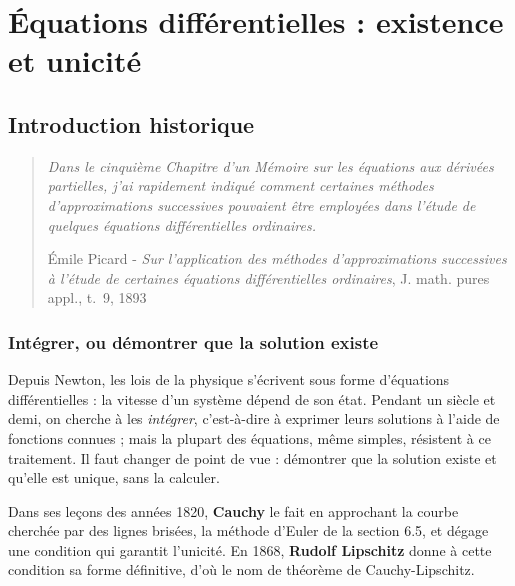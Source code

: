 \documentclass[a4paper,twoside]{report}
\begin{document}
\setcounter{chapter}{5}

\chapter[Équations différentielles : existence]{Équations différentielles : existence et unicité}

\section{Introduction historique}

\begin{quote}
\emph{Dans le cinquième Chapitre d'un Mémoire sur les équations aux dérivées partielles, j'ai rapidement indiqué comment certaines méthodes d'approximations successives pouvaient être employées dans l'étude de quelques équations différentielles ordinaires.}
\begin{flushright}Émile Picard - \emph{Sur l'application des méthodes d'approximations successives à l'étude de certaines équations différentielles ordinaires}, J. math. pures appl., t.~9, 1893\end{flushright}
\end{quote}

\subsection{Intégrer, ou démontrer que la solution existe}

Depuis Newton, les lois de la physique s'écrivent sous forme d'équations différentielles : la vitesse d'un système dépend de son état. Pendant un siècle et demi, on cherche à les \emph{intégrer}, c'est-à-dire à exprimer leurs solutions à l'aide de fonctions connues ; mais la plupart des équations, même simples, résistent à ce traitement. Il faut changer de point de vue : démontrer que la solution existe et qu'elle est unique, sans la calculer.

Dans ses leçons des années 1820, \textbf{Cauchy} le fait en approchant la courbe cherchée par des lignes brisées, la méthode d'Euler de la section 6.5, et dégage une condition qui garantit l'unicité. En 1868, \textbf{Rudolf Lipschitz} donne à cette condition sa forme définitive, d'où le nom de théorème de Cauchy-Lipschitz.
\end{document}
